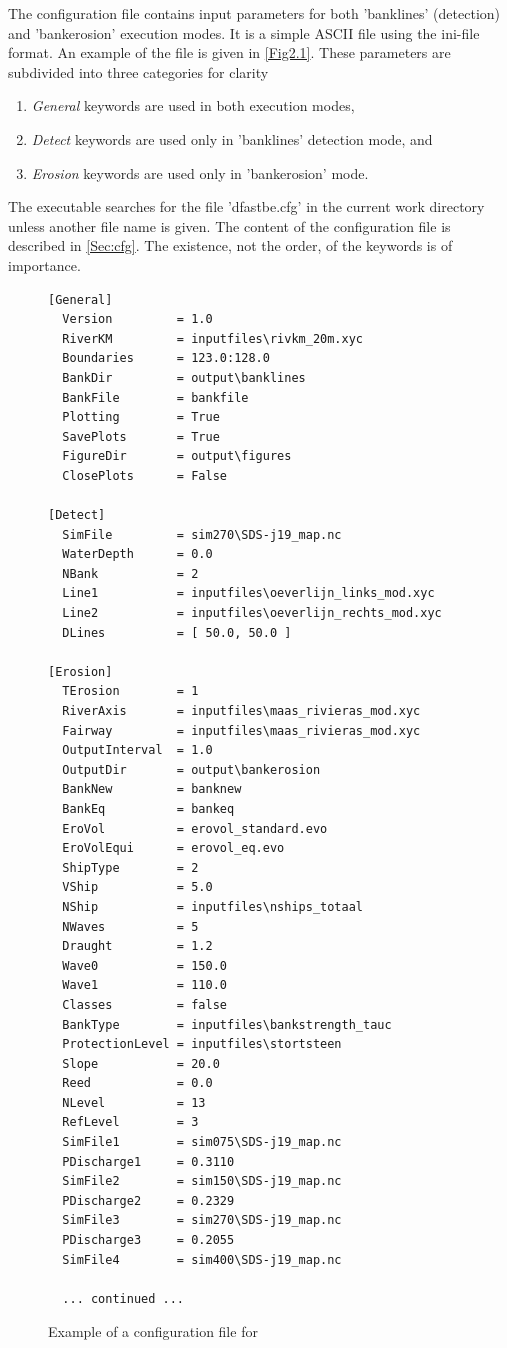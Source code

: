 The configuration file contains input parameters for both 'banklines' (detection) and 'bankerosion' execution modes.
It is a simple ASCII file using the ini-file format.
An example of the file is given in \autoref{Fig2.1}.
These parameters are subdivided into three categories for clarity

\begin{enumerate}
\item \emph{General} keywords are used in both execution modes,
\item \emph{Detect} keywords are used only in 'banklines' detection mode, and
\item \emph{Erosion} keywords are used only in 'bankerosion' mode.
\end{enumerate}

The executable searches for the file 'dfastbe.cfg' in the current work directory unless another file name is given.
The content of the configuration file is described in \autoref{Sec:cfg}.
The existence, not the order, of the keywords is of importance.

\begin{figure}
\begin{verbatim}
[General]
  Version         = 1.0
  RiverKM         = inputfiles\rivkm_20m.xyc
  Boundaries      = 123.0:128.0
  BankDir         = output\banklines
  BankFile        = bankfile
  Plotting        = True
  SavePlots       = True
  FigureDir       = output\figures
  ClosePlots      = False

[Detect]
  SimFile         = sim270\SDS-j19_map.nc
  WaterDepth      = 0.0
  NBank           = 2
  Line1           = inputfiles\oeverlijn_links_mod.xyc
  Line2           = inputfiles\oeverlijn_rechts_mod.xyc
  DLines          = [ 50.0, 50.0 ]

[Erosion]
  TErosion        = 1
  RiverAxis       = inputfiles\maas_rivieras_mod.xyc
  Fairway         = inputfiles\maas_rivieras_mod.xyc
  OutputInterval  = 1.0
  OutputDir       = output\bankerosion
  BankNew         = banknew
  BankEq          = bankeq
  EroVol          = erovol_standard.evo
  EroVolEqui      = erovol_eq.evo
  ShipType        = 2
  VShip           = 5.0
  NShip           = inputfiles\nships_totaal
  NWaves          = 5
  Draught         = 1.2
  Wave0           = 150.0
  Wave1           = 110.0
  Classes         = false
  BankType        = inputfiles\bankstrength_tauc
  ProtectionLevel = inputfiles\stortsteen
  Slope           = 20.0
  Reed            = 0.0
  NLevel          = 13
  RefLevel        = 3
  SimFile1        = sim075\SDS-j19_map.nc
  PDischarge1     = 0.3110
  SimFile2        = sim150\SDS-j19_map.nc
  PDischarge2     = 0.2329
  SimFile3        = sim270\SDS-j19_map.nc
  PDischarge3     = 0.2055
  SimFile4        = sim400\SDS-j19_map.nc

  ... continued ...
\end{verbatim}
\caption{Example of a configuration file for \dfastbe}
\label{Fig2.1}
\end{figure}

